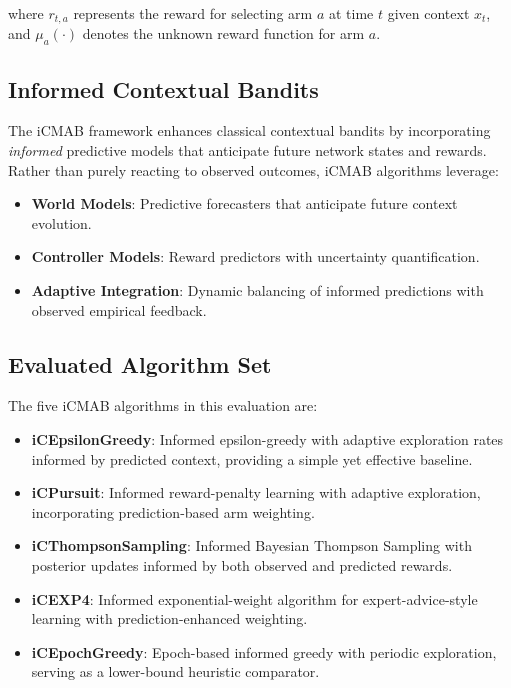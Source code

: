\documentclass[12pt,a4paper]{article}
\begin{document}
where $r_{t,a}$ represents the reward for selecting arm $a$ at time $t$ given context $x_t$, and $\mu_a(\cdot)$ denotes the unknown reward function for arm $a$.

\subsection{Informed Contextual Bandits}

The iCMAB framework enhances classical contextual bandits by incorporating \textit{informed} predictive models that anticipate future network states and rewards. Rather than purely reacting to observed outcomes, iCMAB algorithms leverage:

\begin{itemize}
\item \textbf{World Models}: Predictive forecasters that anticipate future context evolution.
\item \textbf{Controller Models}: Reward predictors with uncertainty quantification.
\item \textbf{Adaptive Integration}: Dynamic balancing of informed predictions with observed empirical feedback.
\end{itemize}

\subsection{Evaluated Algorithm Set}

The five iCMAB algorithms in this evaluation are:

\begin{itemize}
\item \textbf{iCEpsilonGreedy}: Informed epsilon-greedy with adaptive exploration rates informed by predicted context, providing a simple yet effective baseline.
\item \textbf{iCPursuit}: Informed reward-penalty learning with adaptive exploration, incorporating prediction-based arm weighting.
\item \textbf{iCThompsonSampling}: Informed Bayesian Thompson Sampling with posterior updates informed by both observed and predicted rewards.
\item \textbf{iCEXP4}: Informed exponential-weight algorithm for expert-advice-style learning with prediction-enhanced weighting.
\item \textbf{iCEpochGreedy}: Epoch-based informed greedy with periodic exploration, serving as a lower-bound heuristic comparator.
\end{itemize}
\end{document}
